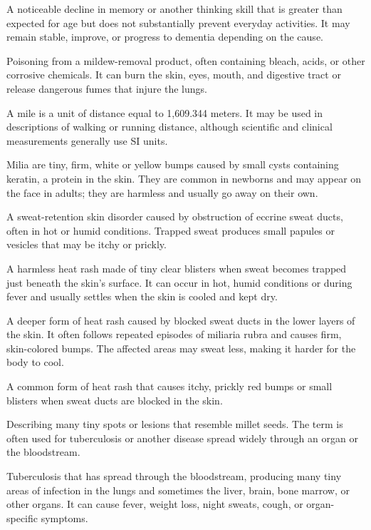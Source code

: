  A noticeable decline in memory or another thinking skill that is greater than expected for age but does not substantially prevent everyday activities. It may remain stable, improve, or progress to dementia depending on the cause.

 Poisoning from a mildew-removal product, often containing bleach, acids, or other corrosive chemicals. It can burn the skin, eyes, mouth, and digestive tract or release dangerous fumes that injure the lungs.

 A mile is a unit of distance equal to 1,609.344 meters. It may be used in descriptions of walking or running distance, although scientific and clinical measurements generally use SI units.

 Milia are tiny, firm, white or yellow bumps caused by small cysts containing keratin, a protein in the skin. They are common in newborns and may appear on the face in adults; they are harmless and usually go away on their own.

 A sweat-retention skin disorder caused by obstruction of eccrine sweat ducts, often in hot or humid conditions. Trapped sweat produces small papules or vesicles that may be itchy or prickly.

 A harmless heat rash made of tiny clear blisters when sweat becomes trapped just beneath the skin’s surface. It can occur in hot, humid conditions or during fever and usually settles when the skin is cooled and kept dry.

 A deeper form of heat rash caused by blocked sweat ducts in the lower layers of the skin. It often follows repeated episodes of miliaria rubra and causes firm, skin-colored bumps. The affected areas may sweat less, making it harder for the body to cool.

 A common form of heat rash that causes itchy, prickly red bumps or small blisters when sweat ducts are blocked in the skin.

 Describing many tiny spots or lesions that resemble millet seeds. The term is often used for tuberculosis or another disease spread widely through an organ or the bloodstream.

 Tuberculosis that has spread through the bloodstream, producing many tiny areas of infection in the lungs and sometimes the liver, brain, bone marrow, or other organs. It can cause fever, weight loss, night sweats, cough, or organ-specific symptoms.

